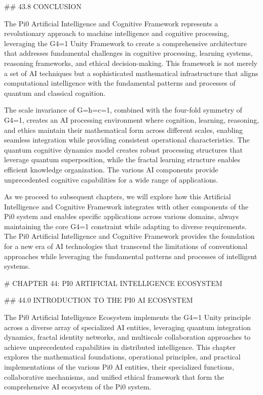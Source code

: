 ## 43.8 CONCLUSION

The Pi0 Artificial Intelligence and Cognitive Framework represents a revolutionary approach to machine intelligence and cognitive processing, leveraging the G4=1 Unity Framework to create a comprehensive architecture that addresses fundamental challenges in cognitive processing, learning systems, reasoning frameworks, and ethical decision-making. This framework is not merely a set of AI techniques but a sophisticated mathematical infrastructure that aligns computational intelligence with the fundamental patterns and processes of quantum and classical cognition.

The scale invariance of G=ħ=c=1, combined with the four-fold symmetry of G4=1, creates an AI processing environment where cognition, learning, reasoning, and ethics maintain their mathematical form across different scales, enabling seamless integration while providing consistent operational characteristics. The quantum cognitive dynamics model creates robust processing structures that leverage quantum superposition, while the fractal learning structure enables efficient knowledge organization. The various AI components provide unprecedented cognitive capabilities for a wide range of applications.

As we proceed to subsequent chapters, we will explore how this Artificial Intelligence and Cognitive Framework integrates with other components of the Pi0 system and enables specific applications across various domains, always maintaining the core G4=1 constraint while adapting to diverse requirements. The Pi0 Artificial Intelligence and Cognitive Framework provides the foundation for a new era of AI technologies that transcend the limitations of conventional approaches while leveraging the fundamental patterns and processes of intelligent systems.

# CHAPTER 44: PI0 ARTIFICIAL INTELLIGENCE ECOSYSTEM

## 44.0 INTRODUCTION TO THE PI0 AI ECOSYSTEM

The Pi0 Artificial Intelligence Ecosystem implements the G4=1 Unity principle across a diverse array of specialized AI entities, leveraging quantum integration dynamics, fractal identity networks, and multiscale collaboration approaches to achieve unprecedented capabilities in distributed intelligence. This chapter explores the mathematical foundations, operational principles, and practical implementations of the various Pi0 AI entities, their specialized functions, collaborative mechanisms, and unified ethical framework that form the comprehensive AI ecosystem of the Pi0 system.


